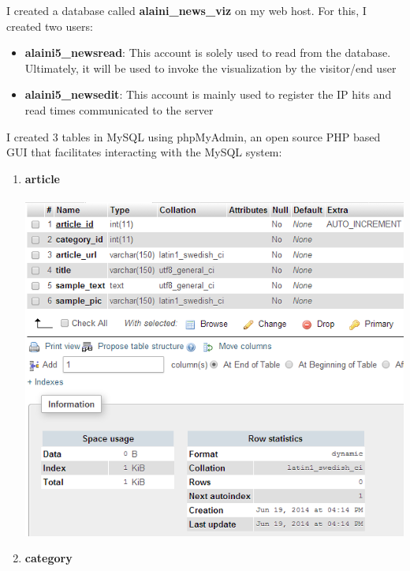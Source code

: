 \documentclass[12pt]{article}
\begin{document}
I created a database called \textbf{alaini\_news\_viz} on my web host. For this, I created two users:\\
\begin{itemize}
\item \textbf{alaini5\_newsread}: This account is solely used to read from the database. Ultimately, it will be used to invoke the visualization by the visitor/end user
\item \textbf{alaini5\_newsedit}: This account is mainly used to register the IP hits and read times communicated to the server
\end{itemize}

I created 3 tables in MySQL using phpMyAdmin, an open source PHP based GUI that facilitates interacting with the MySQL system:
\begin{enumerate}
\item{\textbf{article}}\\ \\
\includegraphics[scale=0.6]{img/article_table}
\item{\textbf{category}}\\ \\

\end{enumerate}
\end{document}
